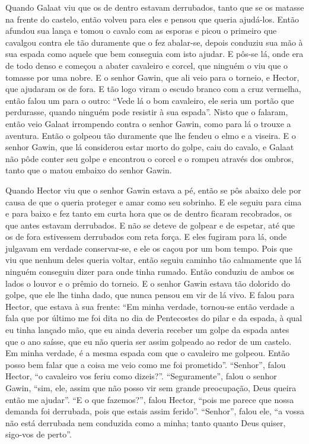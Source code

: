 Quando Galaat viu que os de dentro estavam derrubados, tanto que se os matasse
na frente do castelo, então volveu para eles e pensou que queria ajudá-los.
Então afundou sua lança e tomou o cavalo com as esporas e picou o primeiro que
cavalgou contra ele tão duramente que o fez abalar-se, depois conduziu sua mão
à sua espada como aquele que bem conseguia com isto ajudar. E pôs-se lá, onde
era de todo denso e começou a abater cavaleiro e corcel, que ninguém o viu que
o tomasse por uma nobre. E o senhor Gawin, que ali veio para o torneio, e
Hector, que ajudaram os de fora. E tão logo viram o escudo branco com a cruz
vermelha, então falou um para o outro: “Vede lá o bom cavaleiro, ele seria um
portão que perdurasse, quando ninguém pode resistir à sua espada”. Nisto que o
falaram, então veio Galaat irrompendo contra o senhor Gawin, como para lá o
trouxe a aventura. Então o golpeou tão duramente que lhe fendeu o elmo e a
viseira. E o senhor Gawin, que lá considerou estar morto do golpe, caiu do
cavalo, e Galaat não pôde conter seu golpe e encontrou o corcel e o rompeu
através dos ombros, tanto que o matou embaixo do senhor Gawin.

Quando Hector viu que o senhor Gawin estava a pé, então se pôs abaixo dele por
causa de que o queria proteger e amar como seu sobrinho. E ele seguiu para cima
e para baixo e fez tanto em curta hora que os de dentro ficaram recobrados, os
que antes estavam derrubados. E não se deteve de golpear e de espetar, até que
os de fora estivessem derrubados com reta força. E eles fugiram para lá, onde
julgavam em verdade conservar-se, e ele os caçou por um bom tempo. Pois que viu
que nenhum deles queria voltar, então seguiu caminho tão calmamente que lá
ninguém conseguiu dizer para onde tinha rumado. Então conduziu de ambos os
lados o louvor e o prêmio do torneio. E o senhor Gawin estava tão dolorido do
golpe, que ele lhe tinha dado, que nunca pensou em vir de lá vivo. E falou para
Hector, que estava à sua frente: “Em minha verdade, tornou-se então verdade a
fala que por último me foi dita no dia de Pentecostes do pilar e da espada, à
qual eu tinha lançado mão, que eu ainda deveria receber um golpe da espada
antes que o ano saísse, que eu não queria ser assim golpeado ao redor de um
castelo. Em minha verdade, é a mesma espada com que o cavaleiro me golpeou.
Então posso bem falar que a coisa me veio como me foi prometido”. “Senhor”,
falou Hector, “o cavaleiro vos feriu como dizeis?”. “Seguramente”, falou o
senhor Gawin, “sim, ele, assim que não posso vir sem grande preocupação, Deus
queira então me ajudar”. “E o que fazemos?”, falou Hector, “pois me parece que
nossa demanda foi derrubada, pois que estais assim ferido”. “Senhor”, falou
ele, “a vossa não está derrubada nem conduzida como a minha; tanto quanto Deus
quiser, sigo-vos de perto”. 


